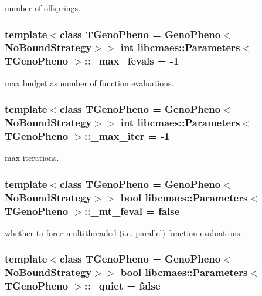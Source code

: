 number of offsprings. \hypertarget{classlibcmaes_1_1Parameters_ad316488121bd51f62b28e8183d591c9e}{
\subsubsection[{\-\_\-max\-\_\-fevals}]{\setlength{\rightskip}{0pt plus 5cm}template$<$class T\-Geno\-Pheno = Geno\-Pheno$<$\-No\-Bound\-Strategy$>$$>$ int {\bf libcmaes\-::\-Parameters}$<$ T\-Geno\-Pheno $>$\-::\-\_\-max\-\_\-fevals = -\/1}}\label{classlibcmaes_1_1Parameters_ad316488121bd51f62b28e8183d591c9e}
max budget as number of function evaluations. \hypertarget{classlibcmaes_1_1Parameters_a60abfc730c5aa46e42ebd1598b59caa6}{
\subsubsection[{\-\_\-max\-\_\-iter}]{\setlength{\rightskip}{0pt plus 5cm}template$<$class T\-Geno\-Pheno = Geno\-Pheno$<$\-No\-Bound\-Strategy$>$$>$ int {\bf libcmaes\-::\-Parameters}$<$ T\-Geno\-Pheno $>$\-::\-\_\-max\-\_\-iter = -\/1}}\label{classlibcmaes_1_1Parameters_a60abfc730c5aa46e42ebd1598b59caa6}
max iterations. \hypertarget{classlibcmaes_1_1Parameters_a78a3b97b4119776b661c1be4fc283069}{
\subsubsection[{\-\_\-mt\-\_\-feval}]{\setlength{\rightskip}{0pt plus 5cm}template$<$class T\-Geno\-Pheno = Geno\-Pheno$<$\-No\-Bound\-Strategy$>$$>$ bool {\bf libcmaes\-::\-Parameters}$<$ T\-Geno\-Pheno $>$\-::\-\_\-mt\-\_\-feval = false}}\label{classlibcmaes_1_1Parameters_a78a3b97b4119776b661c1be4fc283069}
whether to force multithreaded (i.\-e. parallel) function evaluations. \hypertarget{classlibcmaes_1_1Parameters_a6f6dad55c02a23891e3280cad288295a}{
\subsubsection[{\-\_\-quiet}]{\setlength{\rightskip}{0pt plus 5cm}template$<$class T\-Geno\-Pheno = Geno\-Pheno$<$\-No\-Bound\-Strategy$>$$>$ bool {\bf libcmaes\-::\-Parameters}$<$ T\-Geno\-Pheno $>$\-::\-\_\-quiet = false}}\label{classlibcmaes_1_1Parameters_a6f6dad55c02a23891e3280cad288295a}
